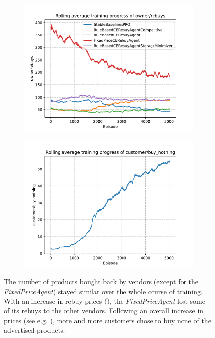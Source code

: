 \begin{figure}[ht]
	\centering
	\begin{subfigure}[t]{0.49\textwidth}
		\centering
		\includegraphics[width = \textwidth]{images/experiments/PPOOligopoly/PPOOligopolyLineOwnerRebuys.pdf}\\
		\label{fig:PPOOligopolyLineOwnerRebuys}
	\end{subfigure}
	\begin{subfigure}[t]{0.49\textwidth}
		\centering
		\includegraphics[width = \textwidth]{images/experiments/PPOOligopoly/PPOOligopolyLineBuyNothing.pdf}\\
		\label{fig:PPOOligopolyLineBuyNothing}
	\end{subfigure}
	\caption{The number of products bought back by vendors (except for the \emph{FixedPriceAgent}) stayed similar over the whole course of training. With an increase in rebuy-prices (), the \emph{FixedPriceAgent} lost some of its rebuys to the other vendors. Following an overall increase in prices (see e.g. ), more and more customers chose to buy none of the advertised products.}\label{fig:PPOOligopolyDiagramsOwners}
\end{figure}